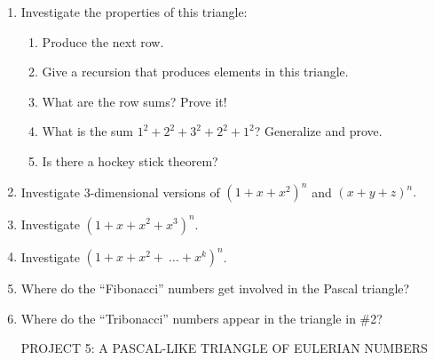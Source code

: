 \documentclass[10pt,letter]{article}
\begin{document}
\begin{enumerate}
\def\labelenumi{\arabic{enumi}.}

\item
  Investigate the properties of this triangle:

\begin{enumerate}
  \def\labelenumii{\alph{enumii}.}

  \item
    Produce the next row.
  \item
    Give a recursion that produces elements in this triangle.
  \item
    What are the row sums? Prove it!
  \item
    What is the sum \(1^{2} + 2^{2} + 3^{2} + 2^{2} + 1^{2}\)?
    Generalize and prove.
  \item
    Is there a hockey stick theorem?
  
\end{enumerate}
\item
  Investigate 3-dimensional versions of
  \(\left( 1 + x + x^{2} \right)^{n}\) and
  \(\left( x + y + z \right)^{n}.\)
\item
  Investigate \(\left( 1 + x + x^{2} + x^{3} \right)^{n}\).
\item
  Investigate \(\left( 1 + x + x^{2} + \ \ldots + x^{k} \right)^{n}\).
\item
  Where do the ``Fibonacci'' numbers get involved in the Pascal
  triangle?
\item
  Where do the ``Tribonacci'' numbers appear in the triangle in \#2?

PROJECT 5: A PASCAL-LIKE TRIANGLE OF EULERIAN NUMBERS

\end{enumerate}
\end{document}
